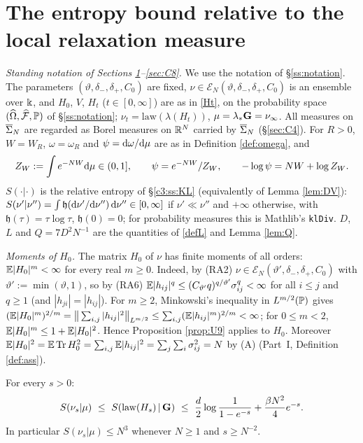 \section{The entropy bound relative to the local relaxation measure}\label{sec:C7}

\noindent\emph{Standing notation of Sections \ref{sec:C7}--\ref{sec:C8}.}
We use the notation of \S\ref{ss:notation}. The parameters $(\vartheta,\delta_-,\delta_+,C_0)$ are fixed, $\nu\in\mathcal E_N(\vartheta,\delta_-,\delta_+,C_0)$ is an ensemble over $\K$, and $H_0$, $V$, $H_t$ ($t\in[0,\infty]$) are as in \eqref{Ht}, on the probability space $(\widehat\Omega,\widehat{\mathcal F},\P)$ of \S\ref{ss:notation}; $\nu_t=\mathrm{law}(\lambda(H_t))$, $\mu=\lambda_*\bG=\nu_\infty$.
All measures on $\cSig$ are regarded as Borel measures on $\R^N$ carried by $\cSig$ (\S\ref{sec:C4}).
For $R>0$, $W=W_R$, $\omega=\omega_R$ and $\psi=\rd\omega/\rd\mu$ are as in Definition \ref{def:omega}, and
\[
Z_W:=\int e^{-NW}\rd\mu\in(0,1],\qquad \psi=e^{-NW}/Z_W,\qquad -\log\psi=NW+\log Z_W .
\]
$S(\cdot|\cdot)$ is the relative entropy of \S\ref{c3:ss:KL} (equivalently of Lemma \ref{lem:DV}): $S(\nu'|\nu'')=\int\mathfrak h(\rd\nu'/\rd\nu'')\,\rd\nu''\in[0,\infty]$ if $\nu'\ll\nu''$ and $+\infty$ otherwise, with $\mathfrak h(\tau)=\tau\log\tau$, $\mathfrak h(0)=0$; for probability measures this is Mathlib's \texttt{klDiv}.
$D$, $L$ and $Q=7D^2N^{-1}$ are the quantities of \eqref{defL} and Lemma \ref{lem:Q}.

\smallskip\noindent\emph{Moments of $H_0$.} The matrix $H_0$ of $\nu$ has finite moments of all orders: $\E|H_0|^m<\infty$ for every real $m\ge0$.
Indeed, by (RA2) $\nu\in\mathcal E_N(\vartheta',\delta_-,\delta_+,C_0)$ with $\vartheta':=\min(\vartheta,1)$, so by (RA6) $\E|h_{ij}|^q\le(C_{\vartheta'}q)^{q/\vartheta'}\sigma_{ij}^q<\infty$ for all $i\le j$ and $q\ge1$ (and $|h_{ji}|=|h_{ij}|$).
For $m\ge2$, Minkowski's inequality in $L^{m/2}(\P)$ gives $(\E|H_0|^m)^{2/m}=\big\|\sum_{i,j}|h_{ij}|^2\big\|_{L^{m/2}}\le\sum_{i,j}(\E|h_{ij}|^m)^{2/m}<\infty$; for $0\le m<2$, $\E|H_0|^m\le1+\E|H_0|^2$.
Hence Proposition \ref{prop:U9} applies to $H_0$. Moreover $\E|H_0|^2=\E\Tr H_0^2=\sum_{i,j}\E|h_{ij}|^2=\sum_j\sum_i\sigma_{ij}^2=N$ by (A) (Part~I, Definition \ref{def:ass}).

\begin{lemma}\label{lem:U8}
For every $s>0$:
\[
S(\nu_s|\mu)\ \le\ S(\mathrm{law}(H_s)\,|\,\bG)\ \le\ \frac d2\log\frac1{1-e^{-s}}+\frac{\beta N^2}{4}e^{-s}.
\]
In particular $S(\nu_s|\mu)\le N^3$ whenever $N\ge1$ and $s\ge N^{-2}$.
\end{lemma}

